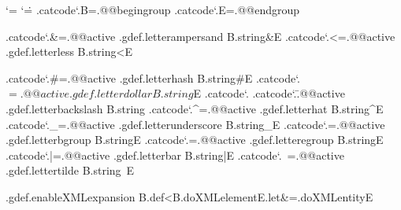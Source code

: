 \unprotect

\def\@@XML            {XML:}
\def\@@XMLentity      {\@@XML ent}
\def\@@XMLelement     {\@@XML ele}
\def\@@XMLvariable    {\@@XML var}
\def\@@XMLvalue       {\@@XML val}
\def\@@XMLpars        {\@@XML par}
\def\@@XMLdata        {\@@XML dat}
\def\@@XMLcode        {\@@XML cod}
\def\@@XMLinstruction {\@@XML ins}

\newtoks\XMLtoks
\newtoks\XMLresetlist

\chardef{}

\newif\ifignoreXMLcase
\newif\ifignoreXMLspaces
\newif\iffixedXMLfont


\let\docompound=| \def\compound#1{\docompound#1|}



\bgroup
\catcode`\*=\@@comment
\catcode`\.=\@@escape
.catcode`.B=.@@begingroup
.catcode`.E=.@@endgroup

.catcode`.&=.@@active .gdef.letterampersand  B.string&E
.catcode`.<=.@@active .gdef.letterless       B.string<E

.catcode`.#=.@@active .gdef.letterhash       B.string#E
.catcode`.$=.@@active .gdef.letterdollar     B.string$E
.catcode`.%
.catcode`.\=.@@active .gdef.letterbackslash  B.string\E
.catcode`.^=.@@active .gdef.letterhat        B.string^E
.catcode`._=.@@active .gdef.letterunderscore B.string_E
.catcode`.{=.@@active .gdef.letterbgroup     B.string{E
.catcode`.}=.@@active .gdef.letteregroup     B.string}E
.catcode`.|=.@@active .gdef.letterbar        B.string|E
.catcode`.~=.@@active .gdef.lettertilde      B.string~E

.gdef.enableXMLexpansion              
  B.def<B.doXMLelementE.let&=.doXMLentityE

